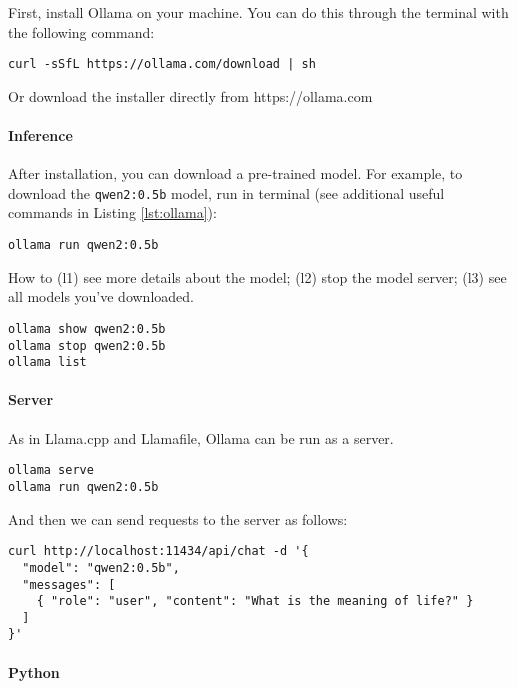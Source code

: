 First, install Ollama on your machine. You can do this through the terminal with the following command:

\begin{verbatim}
curl -sSfL https://ollama.com/download | sh
\end{verbatim}

Or download the installer directly from https://ollama.com

\paragraph{Inference}

After installation, you can download a pre-trained model. For example, to download the \texttt{qwen2:0.5b} model, run in terminal (see additional useful commands in Listing \ref{lst:ollama}):

\begin{verbatim}
ollama run qwen2:0.5b
\end{verbatim}

\begin{marginlisting}[-1.35cm]
	\caption{How to (l1) see more details about the model; (l2) stop the model server; (l3) see all models you've downloaded.}
    \label{lst:ollama}
	\vspace{0.6cm}
\begin{lstlisting}
ollama show qwen2:0.5b
ollama stop qwen2:0.5b
ollama list
\end{lstlisting}
\end{marginlisting}

\paragraph{Server}

As in Llama.cpp and Llamafile, Ollama can be run as a server.

\begin{verbatim}
ollama serve
ollama run qwen2:0.5b
\end{verbatim}

And then we can send requests to the server as follows:

\begin{verbatim}
curl http://localhost:11434/api/chat -d '{
  "model": "qwen2:0.5b",
  "messages": [
    { "role": "user", "content": "What is the meaning of life?" }
  ]
}'
\end{verbatim}

\paragraph{Python}


